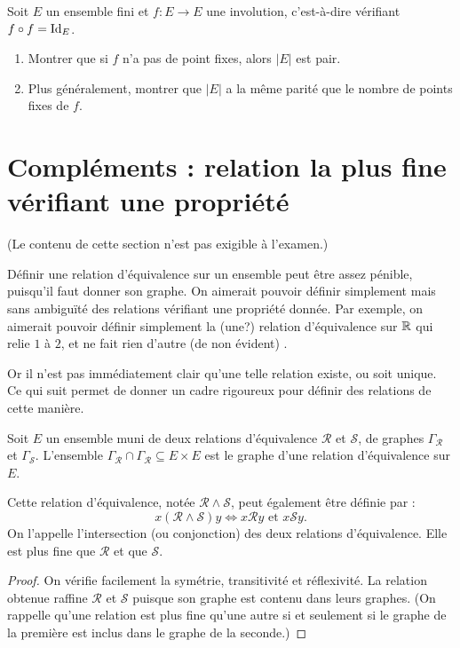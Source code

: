 \begin{exercice}
Soit $E$ un ensemble fini et $f : E\to E$ une involution, c'est-à-dire vérifiant $f\circ f = \operatorname{Id}_E$.
\begin{enumerate}
\item Montrer que si $f$ n'a pas de point fixes, alors $|E|$ est pair.
\item Plus généralement, montrer que $|E|$ a la même parité que le nombre de points fixes de $f$.
\end{enumerate}
\end{exercice}
















\section{Compléments : relation la plus fine vérifiant une propriété}

(Le contenu de cette section n'est pas exigible à l'examen.)

\begin{mdframed}[linewidth=2]
Définir une relation d'équivalence sur un ensemble peut être assez pénible, puisqu'il faut donner son graphe. On aimerait pouvoir définir simplement mais sans ambiguïté des relations vérifiant une propriété donnée. Par exemple, on aimerait pouvoir définir simplement la (une?) relation d'équivalence sur $\mathbb{R}$ qui relie $1$ à $2$, et ne fait \og rien d'autre (de non évident) \fg. 

Or il n'est pas immédiatement clair qu'une telle relation existe, ou soit unique. Ce qui suit permet de donner un cadre rigoureux pour définir des relations de cette manière.
\end{mdframed}

\begin{propdef}
Soit $E$ un ensemble muni de deux relations d'équivalence $\mathcal R$ et $\mathcal S$, de graphes $\Gamma_{\mathcal R}$ et $\Gamma_{\mathcal S}$. L'ensemble $\Gamma_{\mathcal R} \cap \Gamma_{\mathcal R} \subseteq E\times E$ est le graphe d'une relation d'équivalence sur $E$. 

 Cette relation d'équivalence, notée $\mathcal R \wedge \mathcal S$, peut également être  définie par
:
\[x (\mathcal R \wedge \mathcal S) y \iff x\mathcal R y \text{ et } x\mathcal S y.
\]
On l'appelle l'intersection (ou conjonction) des deux relations d'équivalence. Elle est plus fine que $\mathcal R$ et que $\mathcal S$.
\end{propdef}
\begin{proof}
On vérifie facilement la symétrie, transitivité et réflexivité. La relation obtenue raffine $\mathcal R$ et $\mathcal S$ puisque son graphe est contenu dans leurs graphes. (On rappelle qu'une relation est plus fine qu'une autre si et seulement si le graphe de la première est inclus dans le graphe de la seconde.)
\end{proof}

